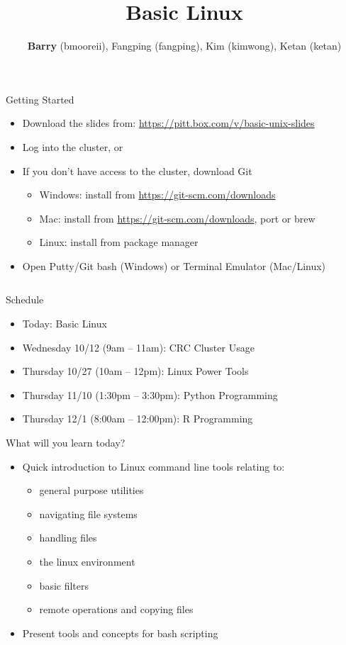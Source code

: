 \documentclass[hyperref={pdfpagelabels=false},12pt]{beamer}
\title[Basic Unix/Linux]{{Basic Linux}}
\author[Basic Unix/Linux]{{\textbf{Barry} (bmooreii), Fangping (fangping), Kim (kimwong), Ketan (ketan)}}
\institute[CRC]{Center for Research Computing}
\date{}
\newcommand{\myvbutton}[2]{\vfill\hyperlink{#1}{\beamerbutton{{#2}}}}
\begin{document}
\begin{frame}[label=started]{Getting Started}
    \begin{itemize}
        \item Download the slides from: \url{https://pitt.box.com/v/basic-unix-slides}
        \item Log into the cluster, or
        \item If you don't have access to the cluster, download Git
        \begin{itemize}
            \item Windows: install from \url{https://git-scm.com/downloads}
            \item Mac: install from \url{https://git-scm.com/downloads}, port or brew
            \item Linux: install from package manager
        \end{itemize}
        \item Open Putty/Git bash (Windows) or Terminal Emulator (Mac/Linux)
    \end{itemize}
\inputminted[bgcolor=lightgray,linenos,fontsize=\scriptsize]{bash}{code/getting-started.txt}
\myvbutton{navigate}{a clickable button}
\end{frame}

\begin{frame}[plain]
\titlepage
\end{frame}

\begin{frame}{Schedule}
\begin{itemize}
    \item Today: Basic Linux
    \item Wednesday 10/12 (9am -- 11am): CRC Cluster Usage
    \item Thursday 10/27 (10am -- 12pm): Linux Power Tools
    \item Thursday 11/10 (1:30pm -- 3:30pm): Python Programming
    \item Thursday 12/1 (8:00am -- 12:00pm): R Programming
\end{itemize}
\end{frame}

\begin{frame}{What will you learn today?}
    \begin{itemize}
        \item Quick introduction to Linux command line tools relating to:
        \begin{itemize}
            \item general purpose utilities
            \item navigating file systems
            \item handling files
            \item the linux environment
            \item basic filters
            \item remote operations and copying files
        \end{itemize}
        \item Present tools and concepts for bash scripting
    \end{itemize}
\end{frame}
\end{document}
